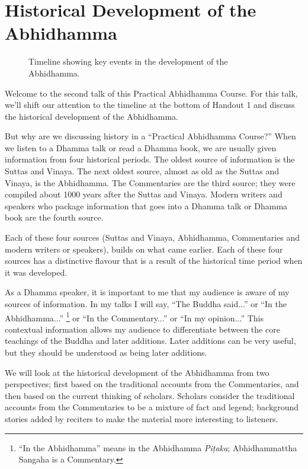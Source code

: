 \section{Historical Development of the Abhidhamma}

\begin{figure}[h]
\centering

\caption{Timeline showing key events in the development of the Abhidhamma.}
\label{fig:Timeline}
\end{figure}

Welcome to the second talk of this Practical Abhidhamma Course. For this talk, we’ll shift our attention to the timeline at the bottom of Handout 1 and discuss the historical development of the Abhidhamma.

But why are we discussing history in a “Practical Abhidhamma Course?” When we listen to a Dhamma talk or read a Dhamma book, we are usually given information from four historical periods. The oldest source of information is the Suttas and Vinaya. The next oldest source, almost as old as the Suttas and Vinaya, is the Abhidhamma. The Commentaries are the third source; they were compiled about 1000 years after the Suttas and Vinaya. Modern writers and speakers who package information that goes into a Dhamma talk or Dhamma book are the fourth source.

Each of these four sources (Suttas and Vinaya, Abhidhamma, Commentaries and modern writers or speakers), builds on what came earlier. Each of these four sources has a distinctive flavour that is a result of the historical time period when it was developed. 

As a Dhamma speaker, it is important to me that my audience is aware of my sources of information. In my talks I will say, “The Buddha said...” or “In the Abhidhamma...” \footnote{“In the Abhidhamma” means in the Abhidhamma \textit{Piṭaka}; Abhidhammattha Sangaha is a Commentary.} or “In the Commentary...” or “In my opinion...” This contextual information allows my audience to differentiate between the core teachings of the Buddha and later additions. Later additions can be very useful, but they should be understood as being later additions.

We will look at the historical development of the Abhidhamma from two perspectives; first based on the traditional accounts from the Commentaries, and then based on the current thinking of scholars. Scholars consider the traditional accounts from the Commentaries to be a mixture of fact and legend; background stories added by reciters to make the material more interesting to listeners. 

